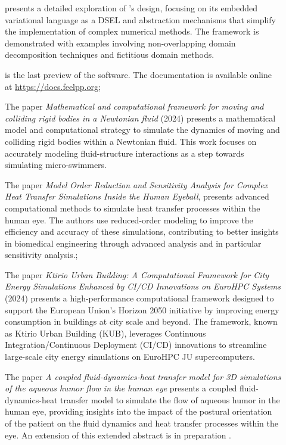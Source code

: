 \begin{description}
        \item[] presents a detailed exploration of \Feelpp's design, focusing on its embedded variational language as a \ac{DSEL} and abstraction mechanisms that simplify the implementation of complex numerical methods. The framework is demonstrated with examples involving non-overlapping domain decomposition techniques and fictitious domain methods.
        \item[] is the last preview of the \Feelpp software. The documentation is available online at \url{https://docs.feelpp.org};
        \item[] The paper \emph{Mathematical and computational framework for moving and colliding rigid bodies in a Newtonian fluid} (2024) presents a mathematical model and computational strategy to simulate the dynamics of moving and colliding rigid bodies within a Newtonian fluid. This work focuses on accurately modeling fluid-structure interactions as a step towards simulating micro-swimmers.
        \item[] The paper \emph{Model Order Reduction and Sensitivity Analysis for Complex Heat Transfer Simulations Inside the Human Eyeball}, presents advanced computational methods to simulate heat transfer processes within the human eye. The authors use reduced-order modeling to improve the efficiency and accuracy of these simulations, contributing to better insights in biomedical engineering through advanced analysis and in particular sensitivity analysis.;
        \item[] The paper \emph{Ktirio Urban Building: A Computational Framework for City Energy Simulations Enhanced by CI/CD Innovations on EuroHPC Systems} (2024) presents a high-performance computational framework designed to support the European Union's Horizon 2050 initiative by improving energy consumption in buildings at city scale and beyond. The framework, known as Ktirio Urban Building (KUB), leverages Continuous Integration/Continuous Deployment (CI/CD) innovations to streamline large-scale city energy simulations on EuroHPC JU supercomputers.
        \item[] The paper \emph{A coupled fluid-dynamics-heat transfer model for 3D simulations of the aqueous humor flow in the human eye} presents a coupled fluid-dynamics-heat transfer model to simulate the flow of aqueous humor in the human eye, providing insights into the impact of the postural orientation of the patient on the fluid dynamics and heat transfer processes within the eye. An extension of this extended abstract is in preparation \cite{saigre_coupled_2024}.

\end{description}
